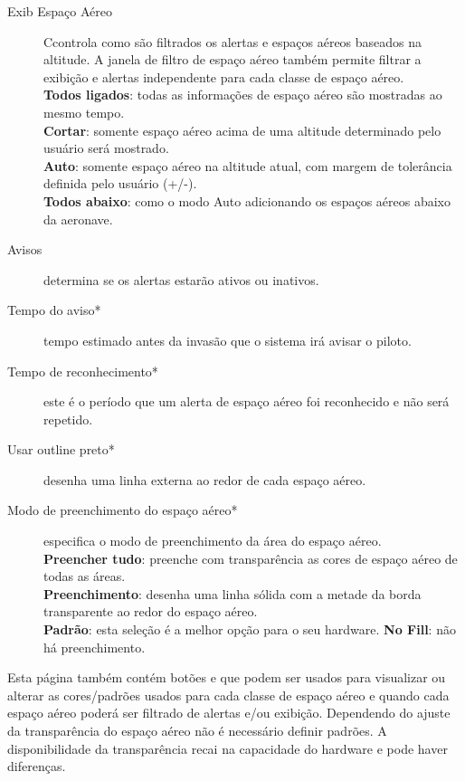 \begin{description}
\item[Exib Espaço Aéreo]  Ccontrola como são filtrados os alertas e espaços aéreos baseados na altitude.  A janela de filtro de espaço aéreo também permite filtrar a exibição e alertas independente para cada classe de espaço aéreo. \\
  {\bf Todos ligados}: todas as informações de espaço aéreo são mostradas ao mesmo tempo. \\
  {\bf Cortar}: somente espaço aéreo acima de uma altitude determinado pelo usuário será mostrado. \\
  {\bf Auto}: somente espaço aéreo na altitude atual, com margem de tolerância definida pelo usuário (+/-).
 \\
  {\bf Todos abaixo}:  como o modo Auto adicionando os espaços aéreos abaixo da aeronave.
\item[Avisos] determina se os alertas estarão ativos ou inativos.
\item[Tempo do aviso*]  tempo estimado antes da invasão que o sistema irá avisar o piloto.
\item[Tempo de reconhecimento*]  este é o período que um alerta de espaço aéreo foi reconhecido e não será repetido.
\item[Usar outline preto*]  desenha uma linha externa ao redor de cada espaço aéreo.
\item[Modo de preenchimento do espaço aéreo*]  especifica o modo de preenchimento da área do espaço aéreo. \\
  {\bf Preencher tudo}:  preenche com transparência as cores de espaço aéreo de todas as áreas. \\
  {\bf Preenchimento}: desenha uma linha sólida com a metade da borda transparente ao redor do espaço aéreo. \\
  {\bf Padrão}:  esta seleção é a melhor opção para o seu hardware.
  {\bf No Fill}: não há preenchimento.
\end{description}

Esta página também contém botões   e  que podem ser usados para visualizar ou alterar as cores/padrões usados para cada classe de espaço aéreo e quando cada espaço aéreo poderá ser filtrado de alertas e/ou exibição.  Dependendo do ajuste da transparência do espaço aéreo não é necessário definir padrões.  A disponibilidade da transparência recai na capacidade do hardware e pode haver diferenças.

